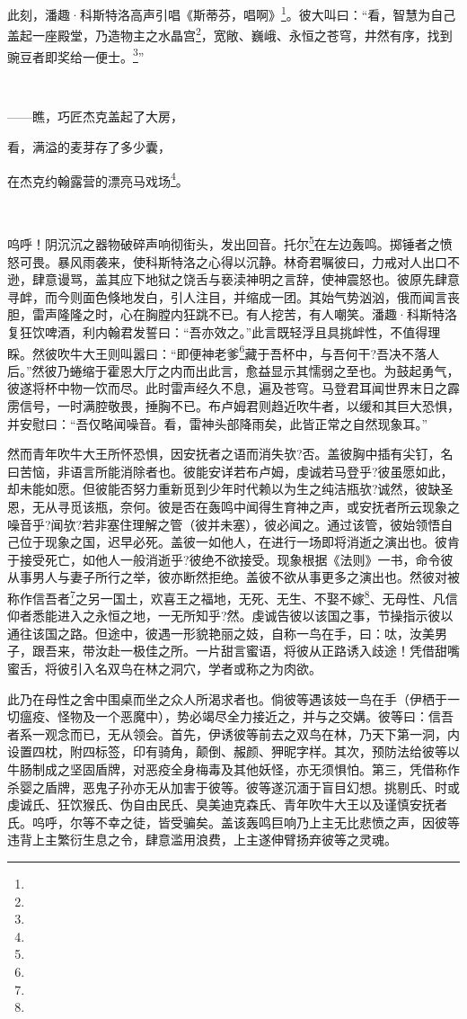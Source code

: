 \par 此刻，潘趣·科斯特洛高声引唱《斯蒂芬，唱啊》\footnote{}。彼大叫曰：“看，智慧为自己盖起一座殿堂，乃造物主之水晶宫\footnote{}，宽敞、巍峨、永恒之苍穹，井然有序，找到豌豆者即奖给一便士。\footnote{}”
\par  
\par ——瞧，巧匠杰克盖起了大房，
\par 看，满溢的麦芽存了多少囊，
\par 在杰克约翰露营的漂亮马戏场\footnote{}。
\par  
\par 呜呼！阴沉沉之器物破碎声响彻街头，发出回音。托尔\footnote{}在左边轰鸣。掷锤者之愤怒可畏。暴风雨袭来，使科斯特洛之心得以沉静。林奇君嘱彼曰，力戒对人出口不逊，肆意谩骂，盖其应下地狱之饶舌与亵渎神明之言辞，使神震怒也。彼原先肆意寻衅，而今则面色倏地发白，引人注目，并缩成一团。其始气势汹汹，俄而闻言丧胆，雷声隆隆之时，心在胸膛内狂跳不已。有人挖苦，有人嘲笑。潘趣·科斯特洛复狂饮啤酒，利内翰君发誓曰：“吾亦效之。”此言既轻浮且具挑衅性，不值得理睬。然彼吹牛大王则叫嚣曰：“即便神老爹\footnote{}藏于吾杯中，与吾何干?吾决不落人后。”然彼乃蜷缩于霍恩大厅之内而出此言，愈益显示其懦弱之至也。为鼓起勇气，彼遂将杯中物一饮而尽。此时雷声经久不息，遍及苍穹。马登君耳闻世界末日之霹雳信号，一时满腔敬畏，捶胸不已。布卢姆君则趋近吹牛者，以缓和其巨大恐惧，并安慰曰：“吾仅略闻噪音。看，雷神头部降雨矣，此皆正常之自然现象耳。”
\par 然而青年吹牛大王所怀恐惧，因安抚者之语而消失欤?否。盖彼胸中插有尖钉，名曰苦恼，非语言所能消除者也。彼能安详若布卢姆，虔诚若马登乎?彼虽愿如此，却未能如愿。但彼能否努力重新觅到少年时代赖以为生之纯洁瓶欤?诚然，彼缺圣恩，无从寻觅该瓶，奈何。彼是否在轰鸣中闻得生育神之声，或安抚者所云现象之噪音乎?闻欤?若非塞住理解之管（彼并未塞），彼必闻之。通过该管，彼始领悟自己位于现象之国，迟早必死。盖彼一如他人，在进行一场即将消逝之演出也。彼肯于接受死亡，如他人一般消逝乎?彼绝不欲接受。现象根据《法则》一书，命令彼从事男人与妻子所行之举，彼亦断然拒绝。盖彼不欲从事更多之演出也。然彼对被称作信吾者\footnote{}之另一国土，欢喜王之福地，无死、无生、不娶不嫁\footnote{}、无母性、凡信仰者悉能进入之永恒之地，一无所知乎?然。虔诚告彼以该国之事，节操指示彼以通往该国之路。但途中，彼遇一形貌艳丽之妓，自称一鸟在手，曰：呔，汝美男子，跟吾来，带汝赴一极佳之所。一片甜言蜜语，将彼从正路诱入歧途！凭借甜嘴蜜舌，将彼引入名双鸟在林之洞穴，学者或称之为肉欲。
\par 此乃在母性之舍中围桌而坐之众人所渴求者也。倘彼等遇该妓一鸟在手（伊栖于一切瘟疫、怪物及一个恶魔中），势必竭尽全力接近之，并与之交媾。彼等曰：信吾者系一观念而已，无从领会。首先，伊诱彼等前去之双鸟在林，乃天下第一洞，内设置四枕，附四标签，印有骑角，颠倒、赧颜、狎昵字样。其次，预防法给彼等以牛肠制成之坚固盾牌，对恶疫全身梅毒及其他妖怪，亦无须惧怕。第三，凭借称作杀婴之盾牌，恶鬼子孙亦无从加害于彼等。彼等遂沉湎于盲目幻想。挑剔氏、时或虔诚氏、狂饮猴氏、伪自由民氏、臭美迪克森氏、青年吹牛大王以及谨慎安抚者氏。呜呼，尔等不幸之徒，皆受骗矣。盖该轰鸣巨响乃上主无比悲愤之声，因彼等违背上主繁衍生息之令，肆意滥用浪费，上主遂伸臂扬弃彼等之灵魂。
